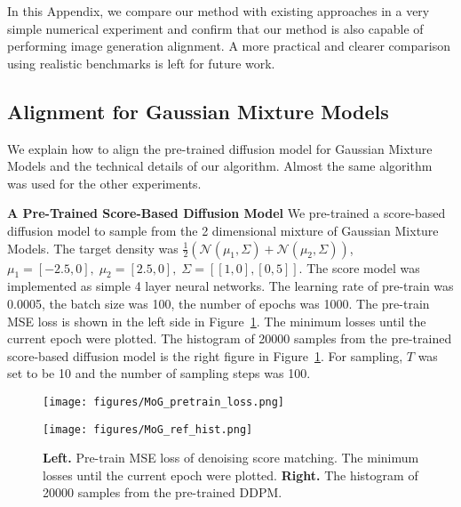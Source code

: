 
In this Appendix, we compare our method with existing approaches in a very simple numerical experiment and confirm that our method is also capable of performing image generation alignment.
A more practical and clearer comparison using realistic benchmarks is left for future work.

\subsection{Alignment for Gaussian Mixture Models}

We explain how to align the pre-trained diffusion model for Gaussian Mixture Models and the technical details of our algorithm. Almost the same algorithm was used for the other experiments.

\textbf{A Pre-Trained Score-Based Diffusion Model}
We pre-trained a score-based diffusion model to sample from the 2 dimensional mixture of Gaussian Mixture Models. The target density was $\frac{1}{2}\left(\mathcal{N}(\mu_1,\Sigma) + \mathcal{N}(\mu_2,\Sigma)\right)$, $\mu_1 = [-2.5, 0], \; \mu_2 = [2.5, 0], \; \Sigma = [[1, 0],[0,5]]$. The score model was implemented as simple 4 layer neural networks. The learning rate of pre-train was 0.0005, the batch size was 100, the number of epochs was 1000. The pre-train MSE loss is shown in the left side in Figure~\ref{fig:mog_pretrain}. The minimum losses until the current epoch were plotted. The histogram of 20000 samples from the pre-trained score-based diffusion model is the right figure in Figure~\ref{fig:mog_pretrain}. For sampling, $T$ was set to be 10 and the number of sampling steps was 100.
\begin{figure}[htbp]
\centering
\begin{minipage}[htbp]{0.49\columnwidth}
    \centering
    \texttt{[image: figures/MoG\_pretrain\_loss.png]}
    \label{fig:mog_pretraiin_hist}
\end{minipage}
\begin{minipage}[htbp]{0.49\columnwidth}
    \centering
    \texttt{[image: figures/MoG\_ref\_hist.png]}
    \label{fig:b}
\end{minipage}
\caption{
\textbf{Left.} Pre-train MSE loss of denoising score matching. The minimum losses until the current epoch were plotted.
\textbf{Right.} The histogram of 20000 samples from the pre-trained DDPM.}
\label{fig:mog_pretrain}
\end{figure}

